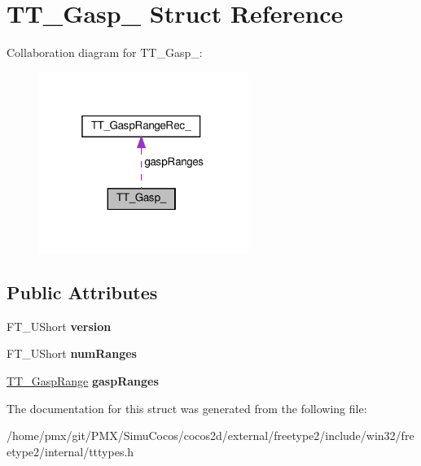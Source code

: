 \hypertarget{structTT__Gasp__}{}\section{T\+T\+\_\+\+Gasp\+\_\+ Struct Reference}
\label{structTT__Gasp__}


Collaboration diagram for T\+T\+\_\+\+Gasp\+\_\+\+:
\nopagebreak
\begin{figure}[H]
\begin{center}
\leavevmode
\includegraphics[width=193pt]{structTT__Gasp____coll__graph}
\end{center}
\end{figure}
\subsection*{Public Attributes}
\begin{DoxyCompactItemize}
\item 
\mbox{\label{structTT__Gasp___a0166777999a11a32068418ed6cf0caf8}} 
F\+T\+\_\+\+U\+Short {\bfseries version}
\item 
\mbox{\label{structTT__Gasp___a03f6dc693ebee0fedc055ac0981ee776}} 
F\+T\+\_\+\+U\+Short {\bfseries num\+Ranges}
\item 
\mbox{\label{structTT__Gasp___a50240e84cfd7fc79ae1f2996ecb2a5d1}} 
\hyperlink{structTT__GaspRangeRec__}{T\+T\+\_\+\+Gasp\+Range} {\bfseries gasp\+Ranges}
\end{DoxyCompactItemize}


The documentation for this struct was generated from the following file\+:\begin{DoxyCompactItemize}
\item 
/home/pmx/git/\+P\+M\+X/\+Simu\+Cocos/cocos2d/external/freetype2/include/win32/freetype2/internal/tttypes.\+h\end{DoxyCompactItemize}
